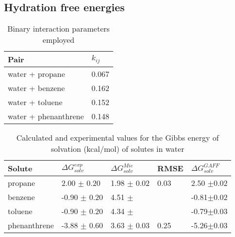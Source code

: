 \subsection{Hydration free energies}


\begin{table}[h]
\center
  \caption{Binary interaction parameters employed}
  \label{tbl:kij}
  \begin{tabular}{ll}
    \hline
      Pair & $k_{ij}$ \\
    \hline
    water  + propane      & 0.067  \\
    water  + benzene      & 0.162 \\  
    water  + toluene      & 0.152 \\
    water  + phenanthrene & 0.148  \\
    \hline
  \end{tabular}

\end{table}

\begin{table*}[h]
\center
  \caption{Calculated and experimental values for the Gibbs energy of solvation (kcal/mol) of solutes in water}
  \label{tbl:solv2}
  \begin{tabular}{lllll}
    \hline
     Solute      & $\Delta G_{solv}^{exp}$ & $\Delta G_{solv}^{Mie}$ & RMSE &$\Delta G_{solv}^{GAFF}$ \\
    \hline
    propane      &  2.00 $\pm$ 0.20 & 1.98 $\pm$ 0.02& 0.03 &2.50 $\pm$0.02 \\
    benzene      & -0.90 $\pm$ 0.20 & 4.51 $\pm$     &      &-0.81$\pm$0.02 \\  
    toluene      & -0.90 $\pm$ 0.20 & 4.34 $\pm$     &      &-0.79$\pm$0.03\\
    phenanthrene & -3.88 $\pm$ 0.60 & 3.63 $\pm$ 0.03& 0.25 &-5.26$\pm$0.03 \\
    \hline
  \end{tabular}

\end{table*}
